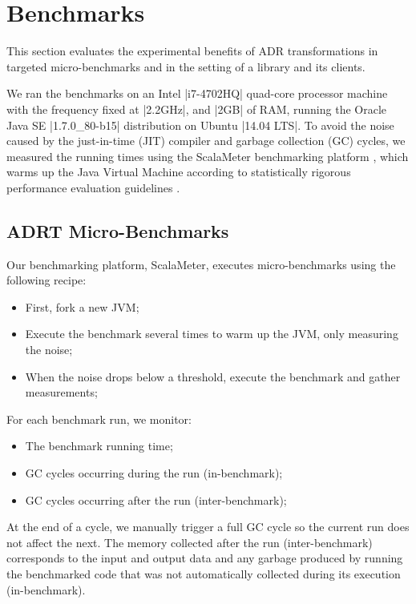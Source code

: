 \section{Benchmarks}
\label{sec:benchmarks}
\label{sec:benchmarks:ad-hoc}

This section evaluates the experimental benefits of ADR transformations in targeted micro-benchmarks and in
the setting of a library and its clients.

We ran the benchmarks on an Intel |i7-4702HQ| quad-core processor machine with the frequency fixed at |2.2GHz|, and |2GB| of RAM, running the Oracle Java SE |1.7.0_80-b15| distribution on Ubuntu |14.04 LTS|. To avoid the noise caused by the just-in-time (JIT) compiler and garbage collection (GC) cycles, we measured the running times using the ScalaMeter benchmarking platform \cite{scalameter}, which warms up the Java Virtual Machine according to statistically rigorous performance evaluation guidelines \cite{rigorous-java-benchmarking}.

\subsection{ADRT Micro-Benchmarks}

Our benchmarking platform, ScalaMeter, executes micro-benchmarks using the following recipe:
\begin{itemize}
  \item First, fork a new JVM;
  \item Execute the benchmark several times to warm up the JVM, only measuring the noise;
  \item When the noise drops below a threshold, execute the benchmark and gather measurements;
\end{itemize}


\noindent
For each benchmark run, we monitor:
\begin{itemize}
  \item The benchmark running time;
  \item GC cycles occurring during the run (in-benchmark);
  \item GC cycles occurring after the run (inter-benchmark);
\end{itemize}


\noindent
At the end of a cycle, we manually trigger a full GC cycle so the current run does not affect the next. The memory collected after the run (inter-benchmark) corresponds to the input and output data and any garbage produced by running the benchmarked code that was not automatically collected during its execution (in-benchmark).

